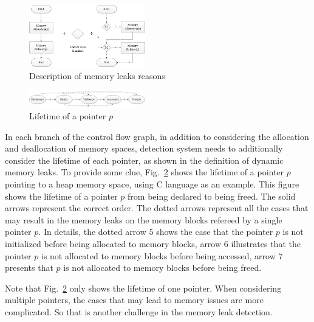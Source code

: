 \begin{figure}[!h]
\center
\includegraphics[width=0.45\textwidth]{figure/fig1-fig4/fig1}
\caption{Description of memory leaks reasons}
\label{fig:1}
\end{figure}

\begin{figure}[!h]
\center
\includegraphics[width=0.45\textwidth]{figure/fig1-fig4/fig2}
\caption{Lifetime of a pointer $p$}
\label{fig:2}
\end{figure}

In each branch of the control flow graph, in addition to considering the allocation and deallocation of memory spaces, detection system needs to additionally consider the lifetime of each pointer, as shown in the definition of dynamic memory leaks. To provide some clue, Fig.~\ref{fig:2} shows the lifetime of a pointer $p$ pointing to a heap memory space, using C language as an example. This figure shows the lifetime of a pointer $p$ from being declared to being freed. The solid arrows represent the correct order. The dotted arrows represent all the cases that may result in the memory leaks on the memory blocks refereed by a single pointer $p$. In details, the dotted arrow $5$ shows the case that the pointer $p$ is not initialized before being allocated to memory blocks, arrow $6$ illustrates that the pointer $p$ is not allocated to memory blocks before being accessed, arrow $7$ presents that $p$ is not allocated to memory blocks before being freed.

Note that Fig.~\ref{fig:2} only shows the lifetime of one pointer. When considering multiple pointers, the cases that may lead to memory issues are more complicated. So that is another challenge in the memory leak detection.
